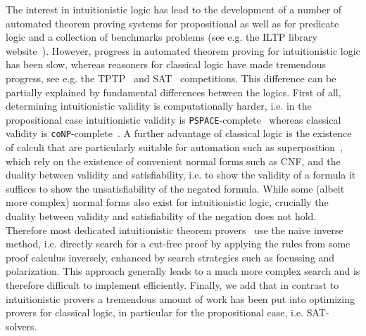 \documentclass[a4paper,UKenglish,cleveref, autoref, thm-restate]{lipics-v2021}
\begin{document}
The interest in intuitionistic logic has lead to the development of a number of automated theorem proving systems for propositional as well as for predicate logic and a collection of benchmarks problems (see e.g. the
ILTP library website~\cite{iltp}).
However, progress in automated theorem proving for intuitionistic logic has been slow, whereas reasoners for classical logic have made tremendous progress, see e.g. the TPTP~\cite{casc} and SAT~\cite{satc} competitions.
This difference can be partially explained by fundamental differences between the logics.
First of all, determining intuitionistic validity is computationally harder, i.e. in the propositional case intuitionistic validity is \verb+PSPACE+-complete~\cite{statman1979intuitionistic} whereas classical validity is \verb+coNP+-complete~\cite{cook1971complexity}.
A further advantage of classical logic is the existence of calculi that are particularly suitable for automation such as superposition~\cite{bachmair2001resolution}, which rely on the existence of convenient normal forms such as CNF, and the duality between validity and satisfiability, i.e. to show the validity of a formula it suffices to show the unsatisfiability of the negated formula.
While some (albeit more complex) normal forms also exist  for intuitionistic logic, crucially the duality between validity and satisfiability of the negation does not hold.
Therefore most dedicated intuitionistic theorem provers~\cite{mclaughlin2009efficient, tammet1996resolution} use the naive inverse method, i.e. directly search for a cut-free proof by applying the rules from some proof calculus inversely, enhanced by search strategies such as focussing and polarization. This approach generally leads to a much more complex search and is therefore difficult to implement efficiently.
Finally, we add that in contrast to intuitionistic provers a tremendous amount of work has been put into optimizing provers for classical logic, in particular for the propositional case, i.e. SAT-solvers.
\end{document}

